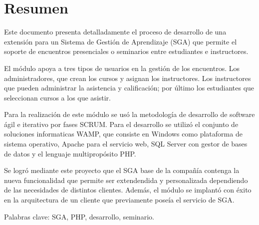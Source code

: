 \chapter*{Resumen}

Este documento presenta detalladamente el proceso de desarrollo de una extensión para un Sistema de Gestión de Aprendizaje (SGA) que permite el soporte de encuentros presenciales o seminarios entre estudiantes e instructores. 

El módulo apoya a tres tipos de usuarios en la gestión de los encuentros. Los administradores, que crean los cursos y asignan los instructores. Los instructores que pueden administrar la asistencia y calificación; por último los estudiantes que seleccionan cursos a los que asistir.

Para la realización de este módulo se usó la metodología de desarrollo de software ágil e iterativo por fases SCRUM. Para el desarrollo se utilizó el conjunto de soluciones informaticas WAMP, que consiste en Windows como plataforma de sistema operativo, Apache para el servicio web, SQL Server con gestor de bases de datos y el lenguaje multipropósito PHP.

Se logró mediante este proyecto que el SGA base de la compañía contenga la nueva funcionalidad que permite ser extendendida y personalizada dependiendo de las necesidades de distintos clientes. Además, el módulo se implantó con éxito en la arquitectura de un cliente que previamente poseía el servicio de SGA.

Palabras clave: SGA, PHP, desarrollo, seminario.




